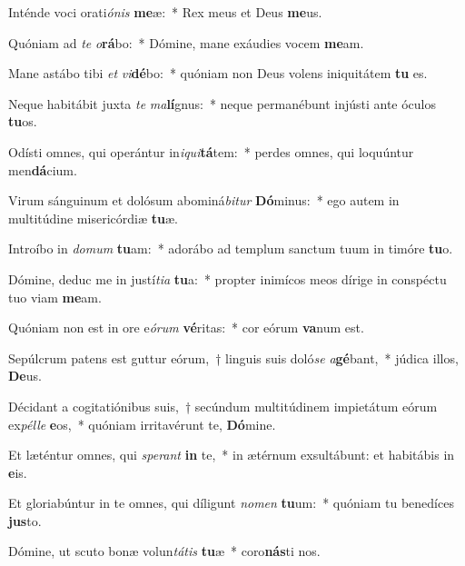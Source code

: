\item Inténde voci orati\textit{ó}\textit{nis} \textbf{me}æ:~* Rex meus et Deus \textbf{me}us.
\item Quóniam ad \textit{te} \textit{o}\textbf{rá}bo:~* Dómine, mane exáudies vocem \textbf{me}am.
\item Mane astábo tibi \textit{et} \textit{vi}\textbf{dé}bo:~* quóniam non Deus volens iniquitátem \textbf{tu} es.
\item Neque habitábit juxta \textit{te} \textit{ma}\textbf{lí}gnus:~* neque permanébunt injústi ante óculos \textbf{tu}os.
\item Odísti omnes, qui operántur in\textit{i}\textit{qui}\textbf{tá}tem:~* perdes omnes, qui loquúntur men\textbf{dá}cium.
\item Virum sánguinum et dolósum abominá\textit{bi}\textit{tur} \textbf{Dó}minus:~* ego autem in multitúdine misericórdiæ \textbf{tu}æ.
\item Introíbo in \textit{do}\textit{mum} \textbf{tu}am:~* adorábo ad templum sanctum tuum in timóre \textbf{tu}o.
\item Dómine, deduc me in justí\textit{ti}\textit{a} \textbf{tu}a:~* propter inimícos meos dírige in conspéctu tuo viam \textbf{me}am.
\item Quóniam non est in ore e\textit{ó}\textit{rum} \textbf{vé}ritas:~* cor eórum \textbf{va}num est.
\item Sepúlcrum patens est guttur eórum,~† linguis suis doló\textit{se} \textit{a}\textbf{gé}bant,~* júdica illos, \textbf{De}us.
\item Décidant a cogitatiónibus suis,~† secúndum multitúdinem impietátum eórum ex\textit{pél}\textit{le} \textbf{e}os,~* quóniam irritavérunt te, \textbf{Dó}mine.
\item Et læténtur omnes, qui \textit{spe}\textit{rant} \textbf{in} te,~* in ætérnum exsultábunt: et habitábis in \textbf{e}is.
\item Et gloriabúntur in te omnes, qui díligunt \textit{no}\textit{men} \textbf{tu}um:~* quóniam tu benedíces \textbf{jus}to.
\item Dómine, ut scuto bonæ volun\textit{tá}\textit{tis} \textbf{tu}æ~* coro\textbf{nás}ti nos.
